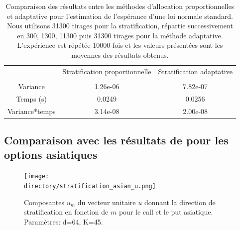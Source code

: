 \documentclass[12pt,a4paper]{report}
\def \directory {/home/jonathan/Programmation/C++/Projet_C++_S2/Images}
\begin{document}
\begin{table}[H]
\centering
	\begin{tabular*}{\textwidth}{@{\extracolsep{\fill}}ccc}
		\hline
		 			    & Stratification proportionnelle 		& Stratification adaptative \\ 
		 			    																	\\
		\hline
		Variance	    & 1.26e-06		                        & 7.82e-07	                \\
		Temps (s)      	& 0.0249		                        & 0.0256                    \\
		Variance*temps	& 3.14e-08                              & 2.00e-08		            \\
		\hline
	\end{tabular*}
\caption{Comparaison des résultats entre les méthodes d'allocation proportionnelles et adaptative pour l'estimation de l'espérance d'une loi normale standard. Nous utilisons 31300 tirages pour la stratification, répartie successivement en 300, 1300, 11300 puis 31300 tirages pour la méthode adaptative. L'expérience est répétée 10000 fois et les valeurs présentées sont les moyennes des résultats obtenus.}
\label{tab:strat_comparaison_proportionnelle_adaptative}
\end{table}

\subsection{Comparaison avec les résultats de \cite{EJ08} pour les options asiatiques}



\begin{figure}[H]
\centering
	\texttt{[image: \\directory/stratification\_asian\_u.png]}

\caption{\small Composantes $u_{m}$ du vecteur unitaire $u$ donnant la direction de stratification en fonction de $m$ pour le call et le put asiatique. Paramètres: d=64, K=45.}
\label{fig:strat_u}
\end{figure}
\end{document}
